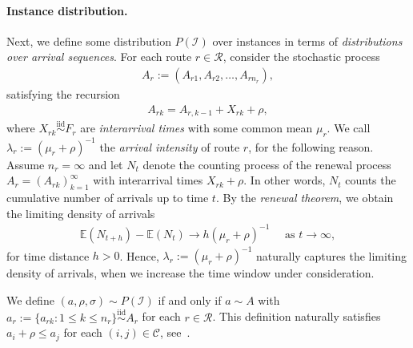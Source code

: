 \documentclass{report}
\theoremstyle{definition}
\theoremstyle{plain}
\begin{document}
\paragraph{Instance distribution.}
Next, we define some distribution $P(\mathcal{I})$ over instances in terms of
\emph{distributions over arrival sequences}.
%
For each route $r \in \mathcal{R}$, consider the stochastic process
\begin{align*}
  A_r := (A_{r1}, A_{r2}, \dots, A_{rn_r}) ,
\end{align*}
satisfying the recursion
\begin{align*}
  A_{rk} = A_{r,k-1} + X_{rk} + \rho ,
\end{align*}
where $X_{rk} \stackrel{\text{iid}}{\sim} F_r$ are \emph{interarrival times}
with some common mean $\mu_r$.
%
We call $\lambda_r := (\mu_r + \rho)^{-1}$ the \emph{arrival intensity} of route
$r$, for the following reason.
%
Assume $n_r = \infty$ and let $N_t$ denote the counting process of the renewal
process $A_r = (A_{rk})_{k=1}^\infty$ with interarrival times $X_{rk} + \rho$.
%
In other words, $N_{t}$ counts the cumulative number of arrivals up to time $t$.
By the \emph{renewal theorem}, we obtain the limiting density of
arrivals
%
\begin{align*}
    \mathbb{E}(N_{t + h}) - \mathbb{E}(N_{t}) \rightarrow h (\mu_r + \rho)^{-1} \quad \text{ as } t \rightarrow \infty ,
\end{align*}
for time distance $h > 0$. Hence, $\lambda_r := {(\mu_r + \rho)}^{-1}$
naturally captures the limiting density of arrivals, when we increase the time
window under consideration.

We define $(a,\rho,\sigma) \sim P(\mathcal{I})$ if and only if $a \sim A$ with
$a_r := \{a_{rk} : 1 \leq k \leq n_r \} \stackrel{\text{iid}}{\sim} A_r$ for each $r\in \mathcal{R}$.
%
This definition naturally satisfies $a_i + \rho \leq a_j$ for each
$(i,j) \in \mathcal{C}$, see~.
\end{document}
